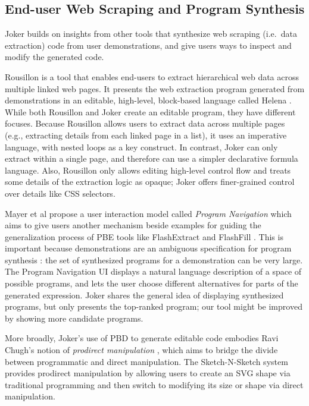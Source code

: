 \documentclass[conference]{IEEEtran}
\begin{document}
\hypertarget{end-user-web-scraping-and-program-synthesis}{%
\subsection{End-user Web Scraping and Program
Synthesis}\label{end-user-web-scraping-and-program-synthesis}}

Joker builds on insights from other tools that synthesize web scraping
(i.e.~data extraction) code from user demonstrations, and give users
ways to inspect and modify the generated code.

Rousillon \citep{chasins2018} is a tool that enables end-users to
extract hierarchical web data across multiple linked web pages. It
presents the web extraction program generated from demonstrations in an
editable, high-level, block-based language called Helena \citep{2021c}.
While both Rousillon and Joker create an editable program, they have
different focuses. Because Rousillon allows users to extract data across
multiple pages (e.g., extracting details from each linked page in a
list), it uses an imperative language, with nested loops as a key
construct. In contrast, Joker can only extract within a single page, and
therefore can use a simpler declarative formula language. Also,
Rousillon only allows editing high-level control flow and treats some
details of the extraction logic as opaque; Joker offers finer-grained
control over details like CSS selectors.

Mayer et al propose a user interaction model called \emph{Program
Navigation} \citep{mayer2015} which aims to give users another mechanism
beside examples for guiding the generalization process of PBE tools like
FlashExtract \citep{le2014} and FlashFill \citep{harris}. This is
important because demonstrations are an ambiguous specification for
program synthesis \citep{peleg2018}: the set of synthesized programs for
a demonstration can be very large. The Program Navigation UI displays a
natural language description of a space of possible programs, and lets
the user choose different alternatives for parts of the generated
expression. Joker shares the general idea of displaying synthesized
programs, but only presents the top-ranked program; our tool might be
improved by showing more candidate programs.

More broadly, Joker's use of PBD to generate editable code embodies Ravi
Chugh's notion of \emph{prodirect manipulation} \citep{chugh2016a},
which aims to bridge the divide between programmatic and direct
manipulation. The Sketch-N-Sketch system \citep{chugh2016} provides
prodirect manipulation by allowing users to create an SVG shape via
traditional programming and then switch to modifying its size or shape
via direct manipulation.
\end{document}
